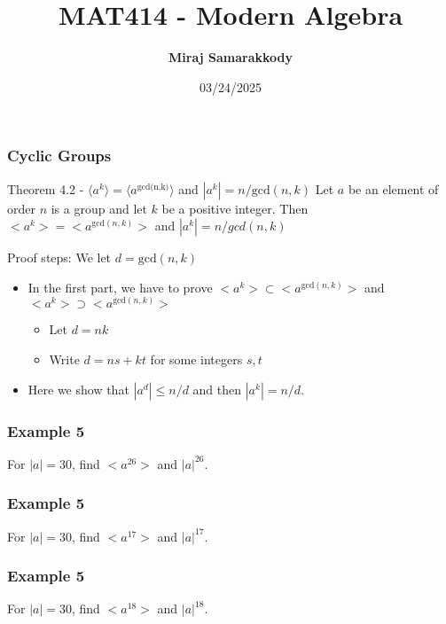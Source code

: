 \documentclass{beamer}
\title{MAT414 - Modern Algebra}
\author{\textbf{Miraj Samarakkody}}
\institute{Tougaloo College}
\date{03/24/2025}
\begin{document}
\begin{frame}
    \titlepage
\end{frame}

\begin{frame}
    \frametitle{Cyclic Groups}

    \begin{block}{Theorem 4.2 - \(\langle a^k \rangle= \langle a^{\text{gcd(n,k)}}\rangle\) and \(|a^k|=n/ \text{gcd}(n,k)\)}
        Let \(a\) be an element of order \(n\) is a group and let \(k\) be a positive integer. Then \(<a^k>=<a^{\text{gcd}(n,k)}>\) and \(|a^k|=n/gcd(n,k)\)
    \end{block}\pause 
    \begin{block}{Proof steps:}
        We let \(d=\text{gcd}(n,k)\)
        \begin{itemize}
            \item In the first part, we have to prove \(<a^k> \subset <a^{\text{gcd}(n,k)}>\) and \(<a^k>\supset <a^{\text{gcd}(n,k)}>\)\pause
            \begin{itemize}
                \item Let \(d=nk\)\pause
                \item Write \(d=ns+kt\) for some integers \(s,t \)\pause
            \end{itemize} 
            \item Here we show that \(|a^d|\leq n/d\) and then \(|a^k| =n/d\). 
        \end{itemize}
        
    \end{block}
\end{frame}

    \begin{frame}
        \frametitle{Example 5}
    For \(|a|=30\), find \(< a^{26} >\) and \(|a|^{26}\).
        
    
    \end{frame}

    
    \begin{frame}
        \frametitle{Example 5}
    For \(|a|=30\), find \(< a^{17} >\) and \(|a|^{17}\).
        
    
    \end{frame}

    \begin{frame}
        \frametitle{Example 5}
    For \(|a|=30\), find \(< a^{18} >\) and \(|a|^{18}\).
        
    
    \end{frame}
\end{document}
